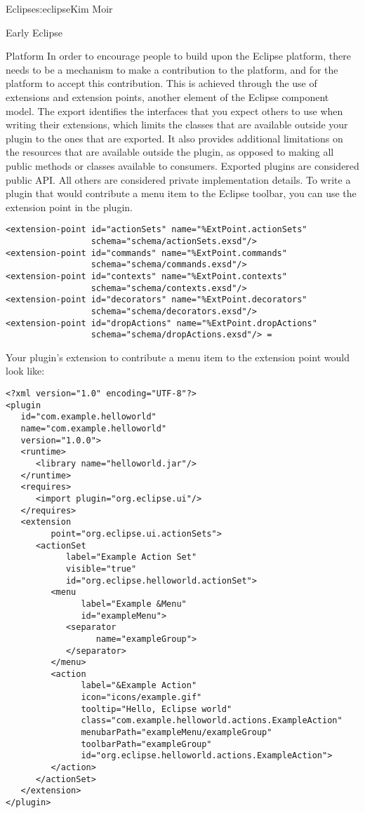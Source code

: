 \begin{aosachapter}{Eclipse}{s:eclipse}{Kim Moir}
\begin{aosasect1}{Early Eclipse}
\begin{aosasect2}{Platform}
In order to encourage people to build upon the Eclipse platform, there
needs to be a mechanism to make a contribution to the platform, and
for the platform to accept this contribution. This is achieved through
the use of extensions and extension points, another element of the
Eclipse component model. The export identifies the interfaces that you
expect others to use when writing their extensions, which limits the
classes that are available outside your plugin to the ones that are
exported. It also provides additional limitations on the resources
that are available outside the plugin, as opposed to making all
public methods or classes available to consumers.  Exported plugins
are considered public API\@. All others are considered private
implementation details. To write a plugin that would contribute a
menu item to the Eclipse toolbar, you can use the 
extension point in the  plugin.

\scriptsize
\begin{verbatim}
<extension-point id="actionSets" name="%ExtPoint.actionSets"
                 schema="schema/actionSets.exsd"/>
<extension-point id="commands" name="%ExtPoint.commands"
                 schema="schema/commands.exsd"/>
<extension-point id="contexts" name="%ExtPoint.contexts"
                 schema="schema/contexts.exsd"/>
<extension-point id="decorators" name="%ExtPoint.decorators"
                 schema="schema/decorators.exsd"/>
<extension-point id="dropActions" name="%ExtPoint.dropActions"
                 schema="schema/dropActions.exsd"/> =
\end{verbatim}
\normalsize

Your plugin's extension to contribute a menu item to the
 extension point would look like:

\begin{verbatim}
<?xml version="1.0" encoding="UTF-8"?>
<plugin
   id="com.example.helloworld"
   name="com.example.helloworld"
   version="1.0.0">
   <runtime>
      <library name="helloworld.jar"/>
   </runtime>
   <requires>
      <import plugin="org.eclipse.ui"/>
   </requires>
   <extension
         point="org.eclipse.ui.actionSets">
      <actionSet
            label="Example Action Set"
            visible="true"
            id="org.eclipse.helloworld.actionSet">
         <menu
               label="Example &Menu"
               id="exampleMenu">
            <separator
                  name="exampleGroup">
            </separator>
         </menu>
         <action
               label="&Example Action"
               icon="icons/example.gif"
               tooltip="Hello, Eclipse world"
               class="com.example.helloworld.actions.ExampleAction"
               menubarPath="exampleMenu/exampleGroup"
               toolbarPath="exampleGroup"
               id="org.eclipse.helloworld.actions.ExampleAction">
         </action>
      </actionSet>
   </extension>
</plugin>
\end{verbatim}


\end{aosasect2}
\end{aosasect1}
\end{aosachapter}
